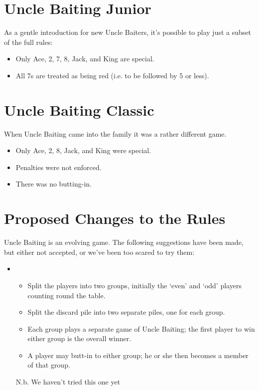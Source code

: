 \documentclass[12pt]{article}
\begin{document}
\section{Uncle Baiting Junior}
\label{Junior}

As a gentle introduction for new Uncle Baiters, it's possible to play just a subset of the full rules:
\begin{itemize}
  \item Only Ace, 2, 7, 8, Jack, and King are special.

  \item All 7s are treated as being red (i.e. to be followed by 5 or less).
\end{itemize}

\section{Uncle Baiting Classic}
\label{Classic}

When Uncle Baiting came into the family it was a rather different game.

\begin{itemize}
  \item Only Ace, 2, 8, Jack, and King were special.

  \item Penalties were not enforced.

  \item There was no butting-in.
\end{itemize}

\section{Proposed Changes to the Rules}
\label{proposedChanges}

Uncle Baiting is an evolving game.  The following suggestions have been made, but
either not accepted, or we've been too scared to try them:

\begin{itemize}
  \item
    \begin{itemize}
      \item Split the players into two groups, initially the `even' and `odd' players counting round the table.
      \item Split the discard pile into two separate piles, one for each group.
      \item Each group plays a separate game of Uncle Baiting;  the first player to
        win either group is the overall winner.
      \item A player may butt-in to either group;  he or she then becomes a member of
        that group.
    \end{itemize}

    N.b. We haven't tried this one yet    

\end{itemize}
\end{document}
